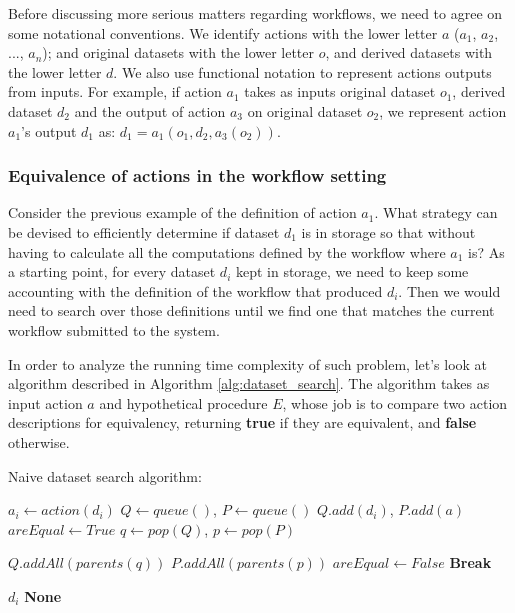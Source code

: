 Before discussing more serious matters regarding workflows, we need to agree on some notational conventions.  We identify actions with the lower letter $a$ ($a_1$, $a_2$, ..., $a_n$); and original datasets with the lower letter $o$, and derived datasets with the lower letter $d$.  We also use functional notation to represent actions outputs from inputs.  For example, if action $a_1$ takes as inputs original dataset $o_1$, derived dataset $d_2$ and the output of action $a_3$ on original dataset $o_2$, we represent action $a_1$'s output $d_1$ as: $d_1 = a_1(o_1, d_2, a_3(o_2))$.

\subsubsection{Equivalence of actions in the workflow setting}
Consider the previous example of the definition of action $a_1$. What strategy can be devised to efficiently determine if dataset $d_1$ is in storage so that without having to calculate all the computations defined by the workflow where $a_1$ is? As a starting point, for every dataset $d_i$ kept in storage, we need to keep some accounting with the definition of the workflow that produced $d_i$.  Then we would need to search over those definitions until we find one that matches the current workflow submitted to the system.  

In order to analyze the running time complexity of such problem, let's look at algorithm described in Algorithm \ref{alg:dataset_search}. The algorithm takes as input action $a$ and hypothetical procedure $E$, whose job is to compare two action descriptions for equivalency, returning \textbf{true} if they are equivalent, and \textbf{false} otherwise.


\begin{algorithm}
\begin{singlespace}
\caption{Naive dataset search algorithm:}
\label{alg:dataset_search}
\begin{algorithmic}[1]
		\State $a_i \gets action(d_i)$ 
		\State $Q \gets queue()$, $P \gets queue()$
		\State $Q.add(d_i)$, $P.add(a)$
		\State $areEqual \gets True$
			\State $q \gets pop(Q)$, $p \gets pop(P)$
			
				\State $Q.addAll(parents(q))$ 
				\State $P.addAll(parents(p))$ 
			\Else
				\State $areEqual \gets False$
				\State \textbf{Break}
			\EndIf
			
		\EndWhile
			\Return $d_i$
		\EndIf
	\EndFor
	\Return \textbf{None}
\EndProcedure
\end{algorithmic}
\end{singlespace}
\end{algorithm}

